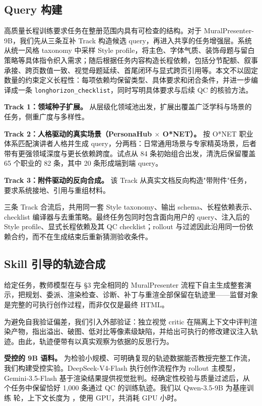 \subsection{Query 构建}

高质量长程训练要求任务在整册范围内具有可检查的结构。对于 MuralPresenter-9B，我们先从三条互补 Track 构造候选 query，再进入共享的任务增强层。系统从统一风格 taxonomy 中采样 Style profile，将主色、字体气质、装饰母题与留白策略等具体指令织入需求；随后根据任务内容构造长程依赖，包括分节配额、叙事承接、跨页数值一致、视觉母题延续、首尾闭环与显式跨页引用等。本文不以固定数量的约束定义长程性：每项依赖均保留类型、具体要求和闭合条件，并进一步编译成一条 \texttt{longhorizon\_checklist}，同时写明具体要求与后续 QC 的核验方法。

\textbf{Track 1：领域种子扩展。} 从层级化领域池出发，扩展出覆盖广泛学科与场景的任务，侧重广度与多样性。

\textbf{Track 2：人格驱动的真实场景（PersonaHub \(\times\) O*NET）。} 按 O*NET 职业体系匹配演讲者人格并生成 query，分两档：日常通用场景与专家精英场景，后者带有更强领域深度与更长依赖跨度。试点从 84 条初始组合出发，清洗后保留覆盖 65 个职业的 82 条，其中 20 条形成端到端 query。

\textbf{Track 3：附件驱动的反向合成。} 该 Track 从真实文档反向构造"带附件"任务，要求系统接地、引用与重组材料。

三条 Track 合流后，共用同一套 Style taxonomy、输出 schema、长程依赖表示、checklist 编译器与去重策略。最终任务包同时包含面向用户的 query、注入后的 Style profile、显式长程依赖及其 QC checklist；rollout 与过滤因此沿用同一份依赖合约，而不在生成结束后重新猜测验收条件。

\subsection{Skill 引导的轨迹合成}

给定任务，教师模型在与 §3 完全相同的 MuralPresenter 流程下自主生成整套演示，把规划、委派、渲染检查、诊断、补丁与重渲全部保留在轨迹里——监督对象是完整的可执行创作过程，而非仅仅是最终 HTML。

为避免自我验证偏差，我们引入外部验证：独立视觉 critic 在隔离上下文中评判渲染产物，指出溢出、破图、低对比等像素级缺陷，并给出可执行的修改建议注入轨迹。由此，轨迹便带有以真实观察为依据的反思行为。

\textbf{受控的 9B 语料。} 为检验小规模、可明确复现的轨迹数据能否教授完整工作流，我们构建受控实验。DeepSeek-V4-Flash 执行创作流程作为 rollout 主模型，Gemini-3.5-Flash 基于渲染结果提供视觉批判。经确定性校验与质量过滤后，从  个任务中保留恰好 1,000 条通过 QC 的训练轨迹。我们以 Qwen-3.5-9B 为基座训练  轮，上下文长度为 ，使用  GPU，共消耗  GPU 小时。

